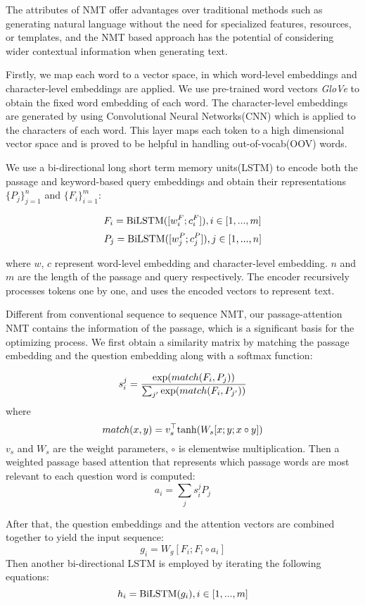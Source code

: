 \documentclass[sigconf]{acmart}
\begin{document}
The attributes of NMT offer advantages over traditional methods such as generating natural language without the need for specialized features, resources, or templates, and the NMT based approach has the potential of considering wider contextual information when generating text.

Firstly, we map each word to a vector space, in which word-level embeddings and character-level embeddings are applied. We use pre-trained word vectors \emph{GloVe}\citep{pennington2014glove} to obtain the fixed word embedding of each word. The character-level embeddings are generated by using Convolutional Neural Networks(CNN) which is applied to the characters of each word. This layer maps each token to a high dimensional vector space and is proved to be helpful in handling out-of-vocab(OOV) words\cite{Yang2016Words}.

We use a bi-directional long short term memory units(LSTM) to encode both the passage and keyword-based query embeddings and obtain their representations $\{ P_{j} \}^{n}_{j=1}$ and $\{ F_{i} \}^{m}_{i=1}$:

 $$F_{i} = {\rm BiLSTM}([w^{F}_{i}; c^{F}_{i}]), i \in [1,...,m]$$
 $$P_{j} = {\rm BiLSTM}([w^{P}_{j}; c^{P}_{j}]), j \in [1,...,n]$$
 
where $w$, $c$ represent word-level embedding and character-level embedding. $n$ and $m$ are the length of the passage and query respectively. The encoder recursively processes tokens one by one, and uses the encoded vectors to represent text.

Different from conventional sequence to sequence NMT, our passage-attention NMT contains the information of the passage, which is a significant basis for the optimizing process. We first obtain a similarity matrix by matching the passage embedding and the question embedding along with a softmax function:

$$s^j_i = \frac{{\rm exp}(match(F_i, P_j))}{\sum_{j^{\prime}}{\rm exp}(match(F_i, P_{j^{\prime}}))}$$
where 
$$match(x,y) = v_s^{\top} {\rm tanh}(W_s[x;y;x \circ y])$$
$v_s$ and $W_s$ are the weight parameters, $\circ$ is elementwise multiplication. Then a weighted passage based attention that represents which passage words are most relevant to each question word is computed:
$$a_i = \sum_j s^j_i P_j$$

After that, the question embeddings and the attention vectors are combined together to yield the input sequence:
$$g_i = W_g [F_i; F_i \circ a_i]$$
Then another bi-directional LSTM is employed by iterating the following equations:
$$h_i = {\rm BiLSTM}(g_i), i \in [1,...,m]$$
\end{document}
